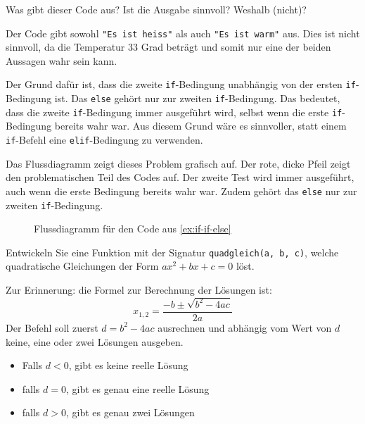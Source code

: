 \begin{myexercise}\label{ex:if-if-else}
	Was gibt dieser Code aus? Ist die Ausgabe sinnvoll? Weshalb (nicht)?
	
	\begin{myanswer}
		Der Code gibt sowohl \lstinline|"Es ist heiss"| als auch \lstinline|"Es ist warm"| aus. Dies ist nicht sinnvoll, da die Temperatur 33 Grad beträgt und somit nur eine der beiden Aussagen wahr sein kann.

		Der Grund dafür ist, dass die zweite \lstinline|if|-Bedingung unabhängig von der ersten \lstinline|if|-Bedingung ist. Das \lstinline|else| gehört nur zur zweiten \lstinline|if|-Bedingung. Das bedeutet, dass die zweite \lstinline|if|-Bedingung immer ausgeführt wird, selbst wenn die erste \lstinline|if|-Bedingung bereits wahr war. Aus diesem Grund wäre es sinnvoller, statt einem \lstinline|if|-Befehl eine \lstinline|elif|-Bedingung zu verwenden.

		Das Flussdiagramm zeigt dieses Problem grafisch auf. Der rote, dicke Pfeil zeigt den problematischen Teil des Codes auf. Der zweite Test wird immer ausgeführt, auch wenn die erste Bedingung bereits wahr war. Zudem gehört das \lstinline|else| nur zur zweiten \lstinline|if|-Bedingung.

		\begin{figure}[H]
			\centering
			
			\caption{Flussdiagramm für den Code aus \cref{ex:if-if-else}}
			\label{fig:if-if-else}
		\end{figure}
	\end{myanswer}
\end{myexercise}

\begin{myexercise}
	Entwickeln Sie eine Funktion mit der Signatur \lstinline|quadgleich(a, b, c)|, welche quadratische Gleichungen der Form \(ax^2 + bx + c = 0\) löst.

	Zur Erinnerung: die Formel zur Berechnung der Lösungen ist:
	\begin{equation}
		x_{1,2} = \frac{-b \pm \sqrt{b^2 - 4ac}}{2a}
	\end{equation}
	Der Befehl soll zuerst \(d = b^2 - 4ac\) ausrechnen und abhängig vom Wert von $d$ keine, eine oder zwei Lösungen ausgeben.
	\begin{itemize}
		\item Falls $d < 0$, gibt es keine reelle Lösung
		\item falls $d = 0$, gibt es genau eine reelle Lösung
		\item falls $d > 0$, gibt es genau zwei Lösungen
	\end{itemize}
	\begin{myanswer}
		
	\end{myanswer}
\end{myexercise}


